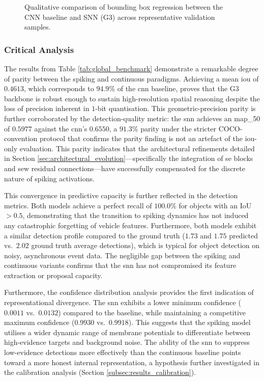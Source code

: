 \begin{figure}[htbp]
    \caption[Qualitative Inference Audit]{Qualitative comparison of bounding box regression between the CNN baseline and SNN (G3) across representative validation samples.}
    \label{fig:qualitative_inference}
\end{figure}

\clearpage

\subsubsection*{Critical Analysis}

The results from Table \ref{tab:global_benchmark} demonstrate a remarkable degree of parity between the spiking and continuous paradigms. Achieving a mean \gls{iou} of $0.4613$, which corresponds to $94.9\%$ of the \gls{cnn} baseline, proves that the G3 backbone is robust enough to sustain high-resolution spatial reasoning despite the loss of precision inherent in $1$-bit quantisation. This geometric-precision parity is further corroborated by the detection-quality metric: the \gls{snn} achieves an \gls{map_50} of $0.5977$ against the \gls{cnn}'s $0.6550$, a $91.3\%$ parity under the stricter COCO-convention protocol that confirms the parity finding is not an artefact of the \gls{iou}-only evaluation. This parity indicates that the architectural refinements detailed in Section \ref{sec:architectural_evolution}---specifically the integration of \gls{se} blocks and \gls{sew} residual connections---have successfully compensated for the discrete nature of spiking activations.

This convergence in predictive capacity is further reflected in the detection metrics. Both models achieve a perfect recall of $100.0\%$ for objects with an IoU $> 0.5$, demonstrating that the transition to spiking dynamics has not induced any catastrophic forgetting of vehicle features. Furthermore, both models exhibit a similar detection profile compared to the ground truth ($1.73$ and $1.75$ predicted vs.\ $2.02$ ground truth average detections), which is typical for object detection on noisy, asynchronous event data. The negligible gap between the spiking and continuous variants confirms that the \gls{snn} has not compromised its feature extraction or proposal capacity.

Furthermore, the confidence distribution analysis provides the first indication of representational divergence. The \gls{snn} exhibits a lower minimum confidence ($0.0011$ vs.\ $0.0132$) compared to the baseline, while maintaining a competitive maximum confidence ($0.9930$ vs.\ $0.9918$). This suggests that the spiking model utilises a wider dynamic range of membrane potentials to differentiate between high-evidence targets and background noise. The ability of the \gls{snn} to suppress low-evidence detections more effectively than the continuous baseline points toward a more honest internal representation, a hypothesis further investigated in the calibration analysis (Section \ref{subsec:results_calibration}).


